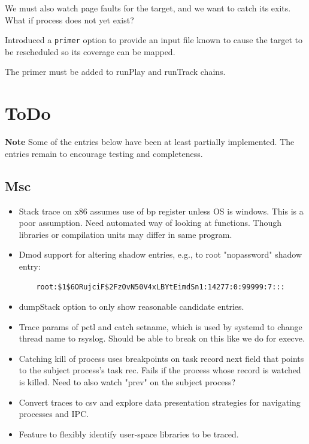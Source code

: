 \documentclass[titlepage]{article}
\begin{document}
\begin{appendices}
We must also watch page faults for the target, and we want to catch its exits.  What if process does not yet exist?

Introduced a {\tt primer} option to provide an input file known to cause the target to be rescheduled so its coverage
can be mapped.

The primer must be added to runPlay and runTrack chains.

\section{ToDo}
\textbf{Note} Some of the entries below have been at least partially implemented.  The entries remain to encourage testing and completeness.
\subsection {Msc}
\begin{itemize}
\item Stack trace on x86 assumes use of bp register unless OS is windows.  This is a poor assumption.  Need automated way
of looking at functions.  Though libraries or compilation units may differ in same program.

\item Dmod support for altering shadow entries, e.g., to root "nopassword" shadow entry:
\begin{verbatim}
    root:$1$6ORujciF$2FzOvN50V4xLBYtEimdSn1:14277:0:99999:7:::
\end{verbatim}

\item dumpStack option to only show reasonable candidate entries.
\item Trace params of pctl and catch setname, which is used by systemd to change thread name to rsyslog.  Should be able to 
break on this like we do for execve.

\item Catching kill of process uses breakpoints on task record next field that points to the subject process's task rec.  Fails if the
process whose record is watched is killed.  Need to also watch "prev" on the subject process?

\item Convert traces to csv and explore data presentation strategies for navigating processes and IPC.

\item Feature to flexibly identify user-space libraries to be traced.


\end{itemize}
\end{appendices}
\end{document}
